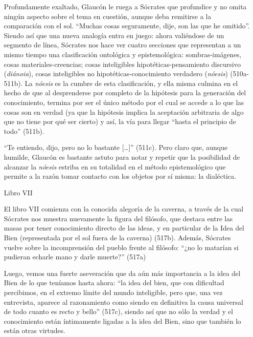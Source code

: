 Profundamente exaltado, Glaucón le ruega a
Sócrates que profundice y no omita ningún
aspecto sobre el tema en cuestión, aunque
deba remitirse a la comparación con el sol.
``Muchas cosas seguramente, dije, son las que
he omitido''. Siendo así que una nueva
analogía entra en juego: ahora valiéndose de
un segmento de línea, Sócrates nos hace ver
cuatro secciones que representan a un mismo
tiempo una clasificación ontológica y
epistemológica: sombras-imágenes, cosas
materiales-creencias; cosas inteligibles
hipotéticas-pensamiento discursivo
(\emph{diánoia}), cosas inteligibles no
hipotéticas-conocimiento verdadero
(\emph{nóesis}) (510a-511b). La \emph{nóesis}
es la cumbre de esta clasificación, y ella
misma culmina en el hecho de que al
desprenderse por completo de la hipótesis
para la generación del conocimiento, termina
por ser el único método por el cual se accede
a lo que las cosas son en verdad (ya que la
hipótesis implica la aceptación arbitraria de
algo que no tiene por qué ser cierto) y así,
la vía para llegar ``hasta el principio de
todo'' (511b).

``Te entiendo, dijo, pero no lo bastante
{[}\ldots{}]'' (511c). Pero claro que, aunque
humilde, Glaucón es bastante astuto para
notar y repetir que la posibilidad de
alcanzar la \emph{nóesis} estriba en su
totalidad en el método epistemológico que
permite a la razón tomar contacto con los
objetos por sí misma: la dialéctica.

Libro VII

El libro VII comienza con la conocida
alegoría de la caverna, a través de la cual
Sócrates nos muestra nuevamente la figura del
filósofo, que destaca entre las masas por
tener conocimiento directo de las ideas, y en
particular de la Idea del Bien (representada
por el sol fuera de la caverna) (517b).
Además, Sócrates vuelve sobre la
incomprensión del pueblo frente al filósofo:
``¿no lo matarían si pudieran echarle mano y
darle muerte?'' (517a)

Luego, vemos una fuerte aseveración que da
aún más importancia a la idea del Bien de lo
que teníamos hasta ahora: ``la idea del bien,
que con dificultad percibimos, en el extremo
límite del mundo inteligible, pero que, una
vez entrevista, aparece al razonamiento como
siendo en definitiva la causa universal de
todo cuanto es recto y bello'' (517c), siendo
así que no sólo la verdad y el conocimiento
están íntimamente ligadas a la idea del Bien,
sino que también lo están otras virtudes.

